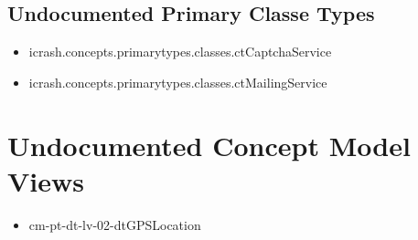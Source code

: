 \subsection[Undocumented Primary Classe Types]{Undocumented Primary Classe Types}
\begin{itemize}
\item icrash.concepts.primarytypes.classes.ctCaptchaService 
\item icrash.concepts.primarytypes.classes.ctMailingService 
\end{itemize}















\section[Undocumented Concept Model Views]{Undocumented Concept Model Views}
\begin{itemize}
\item cm-pt-dt-lv-02-dtGPSLocation 
\end{itemize}


